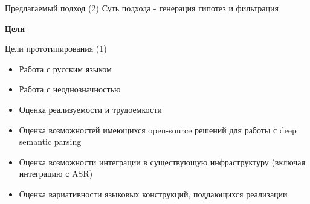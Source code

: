 \documentclass{beamer}
\begin{document}
\begin{frame}{Предлагаемый подход (2)}
Суть подхода - генерация гипотез и фильтрация\\
\bigskip
\bigskip
{}
\end{frame}


\begin{frame}{}
\begin{center}
	\textbf{Цели}\\
\end{center}
\end{frame}


\begin{frame}{Цели прототипирования (1)}
\begin{itemize}
	\item Работа с русским языком
	\item Работа с неоднозначностью
	\item Оценка реализуемости и трудоемкости
	\item Оценка возможностей имеющихся open-source решений для работы с deep semantic parsing
	\item Оценка возможности интеграции в существующую инфраструктуру (включая интеграцию с ASR)
	\item Оценка вариативности языковых конструкций, поддающихся реализации
\end{itemize}
\end{frame}
\end{document}
